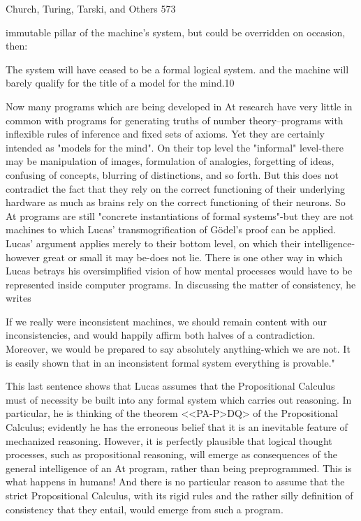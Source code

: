 {Church, Turing, Tarski, and Others                                                        573

immutable pillar of the machine's system, but could be overridden on occasion, then:

   The system will have ceased to be a formal logical system. and the machine will
   barely qualify for the title of a model for the mind.10

Now many programs which are being developed in At research have very little in
common with programs for generating truths of number theory--programs with inflexible
rules of inference and fixed sets of axioms. Yet they are certainly intended as "models for
the mind". On their top level the "informal" level-there may be manipulation of images,
formulation of analogies, forgetting of ideas, confusing of concepts, blurring of
distinctions, and so forth. But this does not contradict the fact that they rely on the correct
functioning of their underlying hardware as much as brains rely on the correct
functioning of their neurons. So At programs are still "concrete instantiations of formal
systems"-but they are not machines to which Lucas' transmogrification of Gödel’s proof
can be applied. Lucas' argument applies merely to their bottom level, on which their
intelligence-however great or small it may be-does not lie.
        There is one other way in which Lucas betrays his oversimplified vision of how
mental processes would have to be represented inside computer programs. In discussing
the matter of consistency, he writes

   If we really were inconsistent machines, we should remain content with our
   inconsistencies, and would happily affirm both halves of a contradiction. Moreover,
   we would be prepared to say absolutely anything-which we are not. It is easily
   shown that in an inconsistent formal system everything is provable."

This last sentence shows that Lucas assumes that the Propositional Calculus must of
necessity be built into any formal system which carries out reasoning. In particular, he is
thinking of the theorem <<PA-P>DQ> of the Propositional Calculus; evidently he has
the erroneous belief that it is an inevitable feature of mechanized reasoning. However, it
is perfectly plausible that logical thought processes, such as propositional reasoning, will
emerge as consequences of the general intelligence of an At program, rather than being
preprogrammed. This is what happens in humans! And there is no particular reason to
assume that the strict Propositional Calculus, with its rigid rules and the rather silly
definition of consistency that they entail, would emerge from such a program.

}
